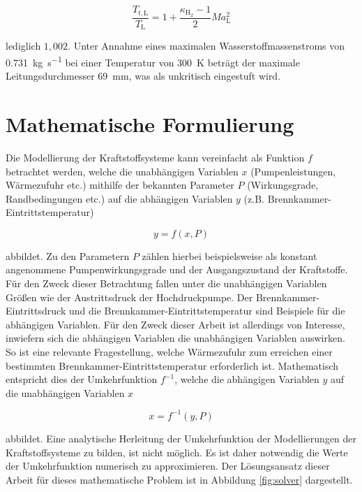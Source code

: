 \begin{equation}\label{Eq:mach}
	\frac{T_{t,\mathrm{L}}}{T_\mathrm{L}}=1+\frac{\kappa_{\mathrm{H}_2}-1}{2}Ma_\mathrm{L}^2
\end{equation}

lediglich $1,002$. Unter Annahme eines maximalen Wasserstoffmassenstroms von \SI{0.731}{\kg\per\s} bei einer Temperatur von \SI{300}{\K} beträgt der maximale Leitungsdurchmesser \SI{69}{\milli\m}, was als unkritisch eingestuft wird.

\section{Mathematische Formulierung}

Die Modellierung der Kraftstoffsysteme kann vereinfacht als Funktion $f$ betrachtet werden, welche die unabhängigen Variablen $x$ (Pumpenleistungen, Wärmezufuhr etc.) mithilfe der bekannten Parameter $P$ (Wirkungsgrade, Randbedingungen etc.) auf die abhängigen Variablen $y$ (z.B. Brennkammer-Eintrittstemperatur)

\begin{equation}\label{Eq:fuel_func}
	y = f(x, P)
\end{equation}

abbildet. Zu den Parametern $P$ zählen hierbei beispielsweise als konstant angenommene Pumpenwirkungsgrade und der Ausgangszustand der Kraftstoffe. Für den Zweck dieser Betrachtung fallen unter die unabhängigen Variablen Größen wie der Austrittsdruck der Hochdruckpumpe. Der Brennkammer-Eintrittsdruck und die Brennkammer-Eintrittstemperatur sind Beispiele für die abhängigen Variablen. Für den Zweck dieser Arbeit ist allerdings von Interesse, inwiefern sich die abhängigen Variablen die unabhängigen Variablen auswirken. So ist eine relevante Fragestellung, welche Wärmezufuhr zum erreichen einer bestimmten Brennkammer-Eintrittstemperatur erforderlich ist. Mathematisch entspricht dies der Umkehrfunktion $f^{-1}$, welche die abhängigen Variablen $y$ auf die unabhängigen Variablen $x$

\begin{equation}\label{Eq:fuel_inverse}
	x = f^{-1}(y, P)
\end{equation}

abbildet. Eine analytische Herleitung der Umkehrfunktion der Modellierungen der Kraftstoffsysteme zu bilden, ist nicht möglich. Es ist daher notwendig die Werte der Umkehrfunktion numerisch zu approximieren. Der Lösungsansatz dieser Arbeit für dieses mathematische Problem ist in Abbildung \ref{fig:solver} dargestellt. 


